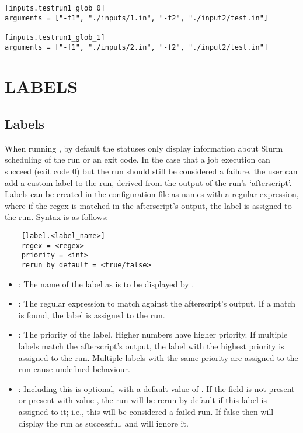 \documentclass[a4paper,english]{article}
\begin{document}
\begin{adjustwidth}{18pt}{0pt}
      \begin{verbatim}
[inputs.testrun1_glob_0]
arguments = ["-f1", "./inputs/1.in", "-f2", "./input2/test.in"]

[inputs.testrun1_glob_1]
arguments = ["-f1", "./inputs/2.in", "-f2", "./input2/test.in"]
      \end{verbatim}

  \section{LABELS}
  \subsection{Labels}
  When running  , by default the statuses only display information
  about Slurm scheduling of the run or an exit code.
  In the case that a job execution can succeed (exit code 0) but the run should still
  be considered a failure, the user can add a custom label to the run, derived from
  the output of the run's `afterscript'.
  Labels can be created in the configuration file as names with a regular expression,
  where if the regex is matched in the afterscript's output, the label is assigned to the run.
  Syntax is as follows:

  \begin{verbatim}
    [label.<label_name>]
    regex = <regex>
    priority = <int>
    rerun_by_default = <true/false>
  \end{verbatim}

  \begin{itemize}
      \item {}: The name of the label as is to be displayed by  .
      \item {}: The regular expression to match against the afterscript's output.
      If a match is found, the label is assigned to the run.
      \item {}: The priority of the label.
      Higher numbers have higher priority.
      If multiple labels match the afterscript's output, the label with the highest priority is assigned to the run.
      Multiple labels with the same priority are assigned to the run cause undefined behaviour.
      \item {}: Including this is optional, with a default value of .
      If the field is not present or present with value , the run will be rerun by default if
      this label is assigned to it; i.e., this will be considered a failed run.
      If false then   will display the run as successful, and   will ignore it.
  \end{itemize}


\end{adjustwidth}
\end{document}
